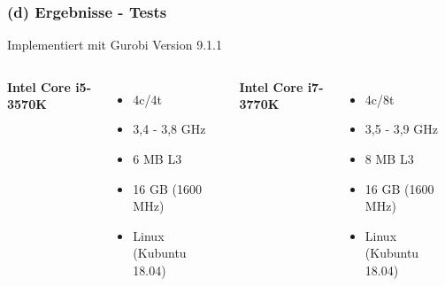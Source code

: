 \documentclass[aspectratio=169]{beamer}
\begin{document}
\begin{frame}
	\frametitle{(d) Ergebnisse - Tests}
	\centering \quad \quad \quad \quad \quad \quad Implementiert mit Gurobi Version 9.1.1
	\newline
	\begin{columns}[c] %
		
		\textbf{Intel Core i5-3570K}
		\begin{itemize}
			\item 4c/4t
			\item 3,4 - 3,8 GHz
			\item 6 MB L3
			\item 16 GB (1600 MHz)
			\item Linux (Kubuntu 18.04)
			
		\end{itemize}
		
		\textbf{Intel Core i7-3770K}
		\begin{itemize}
			\item 4c/8t
			\item 3,5 - 3,9 GHz
			\item 8 MB L3
			\item 16 GB (1600 MHz)
			\item Linux (Kubuntu 18.04)
			
		\end{itemize}
	
	\end{columns}
	\end{frame}
	
\end{document}
